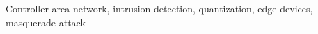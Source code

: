\begin{abstract}
\textcolor{red}{[Abstract: written last, after the framing of the H2 result has been agreed with the advisor.]}
\end{abstract}

\begin{IEEEkeywords}
Controller area network, intrusion detection, quantization, edge devices, masquerade attack
\end{IEEEkeywords}
